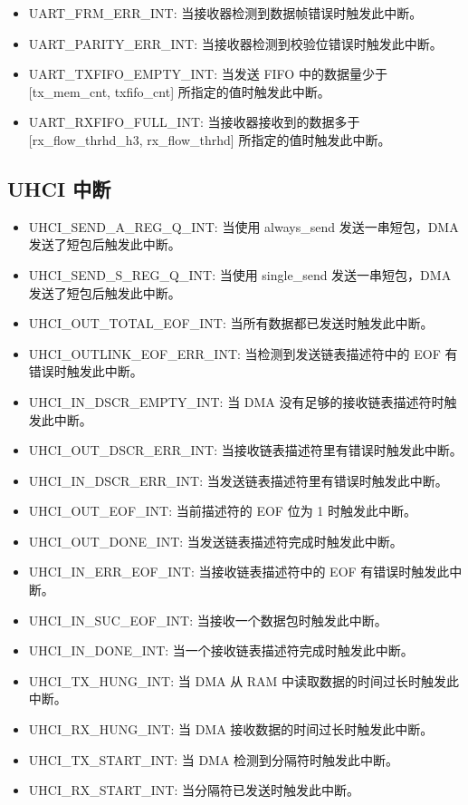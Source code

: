 \documentclass[main\_\_CN.tex]{subfiles}
\begin{document}
\begin{itemize}
\item \label{int:UARTFRMERRINT}UART\_FRM\_ERR\_INT: 当接收器检测到数据帧错误时触发此中断。
\item \label{int:UARTPARITYERRINT}UART\_PARITY\_ERR\_INT: 当接收器检测到校验位错误时触发此中断。
\item \label{int:UARTTXFIFOEMPTYINT}UART\_TXFIFO\_EMPTY\_INT: 当发送 FIFO 中的数据量少于 [tx\_mem\_cnt, txfifo\_cnt] 所指定的值时触发此中断。
\item \label{int:UARTRXFIFOFULLINT}UART\_RXFIFO\_FULL\_INT: 当接收器接收到的数据多于 [rx\_flow\_thrhd\_h3, rx\_flow\_thrhd] 所指定的值时触发此中断。
\end{itemize}

\subsection{UHCI 中断}
\begin{itemize}
\item \label{int:UHCISENDAREGQINT}UHCI\_SEND\_A\_REG\_Q\_INT: 当使用 always\_send 发送一串短包，DMA 发送了短包后触发此中断。
\item \label{int:UHCISENDSREGQINT}UHCI\_SEND\_S\_REG\_Q\_INT: 当使用 single\_send 发送一串短包，DMA 发送了短包后触发此中断。
\item \label{int:UHCIOUTTOTALEOFINT}UHCI\_OUT\_TOTAL\_EOF\_INT: 当所有数据都已发送时触发此中断。
\item \label{int:UHCIOUTLINKEOFERRINT}UHCI\_OUTLINK\_EOF\_ERR\_INT: 当检测到发送链表描述符中的 EOF 有错误时触发此中断。
\item \label{int:UHCIINDSCREMPTYINT}UHCI\_IN\_DSCR\_EMPTY\_INT: 当 DMA 没有足够的接收链表描述符时触发此中断。
\item \label{int:UHCIOUTDSCRERRINT}UHCI\_OUT\_DSCR\_ERR\_INT: 当接收链表描述符里有错误时触发此中断。
\item \label{int:UHCIINDSCRERRINT}UHCI\_IN\_DSCR\_ERR\_INT: 当发送链表描述符里有错误时触发此中断。
\item \label{int:UHCIOUTEOFINT}UHCI\_OUT\_EOF\_INT: 当前描述符的 EOF 位为 1 时触发此中断。
\item \label{int:UHCIOUTDONEINT}UHCI\_OUT\_DONE\_INT: 当发送链表描述符完成时触发此中断。
\item \label{int:UHCIINERREOFINT}UHCI\_IN\_ERR\_EOF\_INT: 当接收链表描述符中的 EOF 有错误时触发此中断。
\item \label{int:UHCIINSUCEOFINT}UHCI\_IN\_SUC\_EOF\_INT: 当接收一个数据包时触发此中断。
\item \label{int:UHCIINDONEINT}UHCI\_IN\_DONE\_INT: 当一个接收链表描述符完成时触发此中断。
\item \label{int:UHCITXHUNGINT}UHCI\_TX\_HUNG\_INT: 当 DMA 从 RAM 中读取数据的时间过长时触发此中断。
\item \label{int:UHCIRXHUNGINT}UHCI\_RX\_HUNG\_INT: 当 DMA 接收数据的时间过长时触发此中断。
\item \label{int:UHCITXSTARTINT}UHCI\_TX\_START\_INT: 当 DMA 检测到分隔符时触发此中断。
\item \label{int:UHCIRXSTARTINT}UHCI\_RX\_START\_INT: 当分隔符已发送时触发此中断。
\end{itemize}
\end{document}
